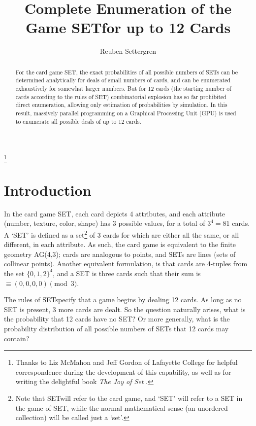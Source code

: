 \documentclass[10pt]{amsart}
\newcommand{\SET}{SET\texttrademark}
\begin{document}
\title[SET Enumeration]{Complete Enumeration of the Game \SET for up to 12 Cards}
\author[Settergren]{Reuben Settergren}

\thanks{Thanks to Liz McMahon and Jeff Gordon of Lafayette College for helpful
  correspondence during the development of this capability, as well as for
  writing the delightful book {\em The Joy of Set} \cite{JOS}.}

\maketitle

\begin{abstract}
For the card game \SET, the exact probabilities of all possible numbers of SETs
can be determined analytically for deals of small numbers of cards, and can be
enumerated exhaustively for somewhat larger numbers. But for 12 cards (the
starting number of cards according to the rules of \SET) combinatorial explosion
has so far prohibited direct enumeration, allowing only estimation of
probabilities by simulation. In this result, massively parallel programming on a
Graphical Processing Unit (GPU) is used to enumerate all possible deals of up to
12 cards.
\end{abstract}

\section{Introduction}
In the card game \SET, each card depicts 4 attributes, and each attribute
(number, texture, color, shape) has 3 possible values, for a total of $3^4=81$
cards. A `SET' is defined as a set\footnote{Note that \SET will refer to the
  card game, and `SET' will refer to a SET in the game of \SET, while the normal
  mathematical sense (an unordered collection) will be called just a `set'.} of
3 cards for which are either all the same, or all different, in each
attribute. As such, the card game is equivalent to the finite geometry AG(4,3);
cards are analogous to points, and SETs are lines (sets of collinear
points). Another equivalent formulation, is that cards are 4-tuples from the set
$\{0,1,2\}^4$, and a SET is three cards such that their sum is $\equiv (0,0,0,0)
\pmod 3$.

The rules of \SET specify that a game begins by dealing 12 cards. As long as no
SET is present, 3 more cards are dealt. So the question naturally arises, what
is the probability that 12 cards have no SET? Or more generally, what is the
probability distribution of all possible numbers of SETs that 12 cards may
contain?
\end{document}
